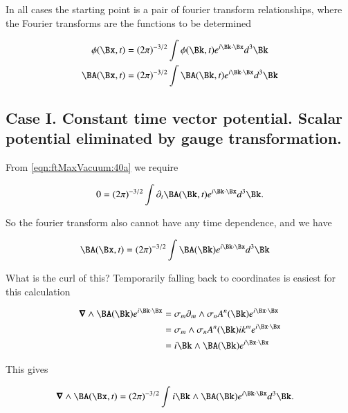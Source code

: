 In all cases the starting point is a pair of fourier transform relationships, where the Fourier transforms are the functions to be determined

\begin{subequations}
\label{eqn:ftMaxVacuum:40}
\begin{align}
\phi(\Bx, t) &= (2 \pi)^{-3/2} \int \phi(\Bk, t) e^{i \Bk \cdot \Bx } d^3 \Bk 
\label{eqn:ftMaxVacuum:40a}
\\
\BA(\Bx, t) &= (2 \pi)^{-3/2} \int \BA(\Bk, t) e^{i \Bk \cdot \Bx } d^3 \Bk 
\label{eqn:ftMaxVacuum:40b}
\end{align}
\end{subequations}

\subsection{Case I.  Constant time vector potential.  Scalar potential eliminated by gauge transformation.}

From \autoref{eqn:ftMaxVacuum:40a} we require

\begin{align}\label{eqn:ftMaxVacuum:50}
0 = (2 \pi)^{-3/2} \int \partial_t \BA(\Bk, t) e^{i \Bk \cdot \Bx } d^3 \Bk.
\end{align}

So the fourier transform also cannot have any time dependence, and we have

\begin{align}\label{eqn:ftMaxVacuum:51}
\BA(\Bx, t) &= (2 \pi)^{-3/2} \int \BA(\Bk) e^{i \Bk \cdot \Bx } d^3 \Bk 
\end{align}

What is the curl of this?  Temporarily falling back to coordinates is easiest for this calculation

\begin{align*}
\spacegrad \wedge \BA(\Bk) e^{i\Bk \cdot \Bx}
&=
\sigma_m \partial_m \wedge \sigma_n A^n(\Bk) e^{i \Bx \cdot \Bx} \\
&=
\sigma_m \wedge \sigma_n A^n(\Bk) i k^m e^{i \Bx \cdot \Bx} \\
&=
i\Bk \wedge \BA(\Bk) e^{i \Bx \cdot \Bx} \\
\end{align*}

This gives

\begin{align}\label{eqn:ftMaxVacuum:52}
\spacegrad \wedge \BA(\Bx, t) &= (2 \pi)^{-3/2} \int i \Bk \wedge \BA(\Bk) e^{i \Bk \cdot \Bx } d^3 \Bk.
\end{align}


